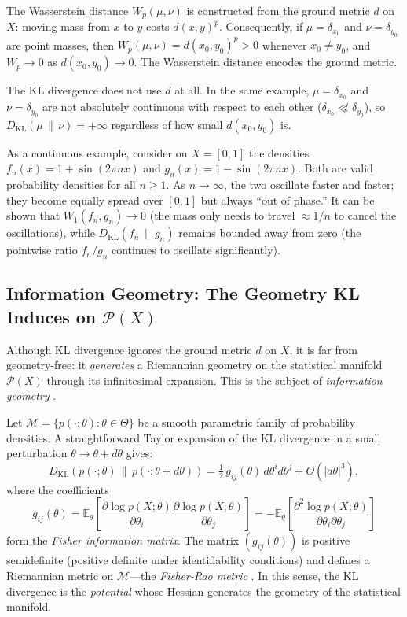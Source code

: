 \documentclass[12pt]{article}
\newcommand{\KL}[2]{D_{\mathrm{KL}}\!\left(#1\,\|\,#2\right)}
\newcommand{\calP}{\mathcal{P}}
\begin{document}
The Wasserstein distance $W_p(\mu,\nu)$ is constructed from the
ground metric $d$ on $X$: moving mass from $x$ to $y$ costs
$d(x,y)^p$.  Consequently, if $\mu = \delta_{x_0}$ and
$\nu = \delta_{y_0}$ are point masses, then
$W_p(\mu,\nu) = d(x_0,y_0)^p > 0$ whenever $x_0 \neq y_0$,
and $W_p \to 0$ as $d(x_0, y_0) \to 0$.  The Wasserstein
distance encodes the ground metric.

The KL divergence does not use $d$ at all.  In the same example,
$\mu = \delta_{x_0}$ and $\nu = \delta_{y_0}$ are not absolutely
continuous with respect to each other ($\delta_{x_0} \not\ll
\delta_{y_0}$), so $\KL{\mu}{\nu} = +\infty$ regardless of how
small $d(x_0,y_0)$ is.

As a continuous example, consider on $X = [0,1]$ the densities
$f_n(x) = 1 + \sin(2\pi n x)$ and $g_n(x) = 1 - \sin(2\pi n x)$.
Both are valid probability densities for all $n \geq 1$.  As
$n \to \infty$, the two oscillate faster and faster; they become
equally spread over $[0,1]$ but always ``out of phase.''  It can
be shown that $W_1(f_n, g_n) \to 0$ (the mass only needs to
travel $\approx 1/n$ to cancel the oscillations), while
$\KL{f_n}{g_n}$ remains bounded away from zero (the pointwise
ratio $f_n/g_n$ continues to oscillate significantly).

\subsection{Information Geometry: The Geometry KL Induces on $\calP(X)$}
\label{sec:info_geom}

Although KL divergence ignores the ground metric $d$ on $X$,
it is far from geometry-free: it \emph{generates} a Riemannian
geometry on the statistical manifold $\calP(X)$ through its
infinitesimal expansion.  This is the subject of
\emph{information geometry} \citep{Amari1985,AmariNagaoka2000,Amari2016,Nielsen2020}.

Let $\mathcal{M} = \{p(\cdot;\theta) : \theta \in \Theta\}$ be
a smooth parametric family of probability densities.  A
straightforward Taylor expansion of the KL divergence in a
small perturbation $\theta \to \theta + d\theta$ gives:
\begin{equation}\label{eq:fisher_kl}
  \KL{p(\cdot;\theta)}{p(\cdot;\theta+d\theta)}
  = \tfrac{1}{2}\,g_{ij}(\theta)\,d\theta^i d\theta^j + O(|d\theta|^3),
\end{equation}
where the coefficients
\begin{equation}\label{eq:fisher_metric}
  g_{ij}(\theta)
  = \mathbb{E}_{\theta}\!\left[
    \frac{\partial \log p(X;\theta)}{\partial \theta_i}
    \frac{\partial \log p(X;\theta)}{\partial \theta_j}
  \right]
  = -\mathbb{E}_{\theta}\!\left[
    \frac{\partial^2 \log p(X;\theta)}{\partial \theta_i \partial \theta_j}
  \right]
\end{equation}
form the \emph{Fisher information matrix}.  The matrix
$(g_{ij}(\theta))$ is positive semidefinite (positive definite
under identifiability conditions) and defines a Riemannian metric
on $\mathcal{M}$---the \emph{Fisher-Rao metric}
\citep{Rao1945}.  In this sense, the KL divergence is the
\emph{potential} whose Hessian generates the geometry of the
statistical manifold.
\end{document}
